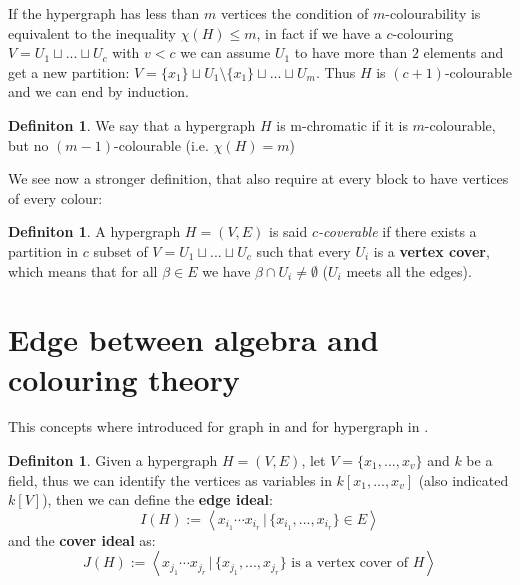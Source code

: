 \documentclass[notitlepage, a4]{book}
\theoremstyle{plain}
\theoremstyle{remark}
\theoremstyle{definition}
\newtheorem{deff}[teo]{Definiton}
\begin{document}
If the hypergraph has less than $ m $ vertices the condition of $ m $-colourability is equivalent to the inequality $ \chi(H) \leq m $, in fact if we have a $ c $-colouring $ V = U_1 \sqcup ... \sqcup U_c $ with $ v < c $ we can assume $ U_1 $ to have more than $ 2 $ elements and get a new partition: $ V = \{x_1\} \sqcup U_1 \setminus \{x_1\} \sqcup ... \sqcup U_m $. Thus $ H $ is $ (c+1) $-colourable and we can end by induction.

\begin{deff}
We say that a hypergraph $ H $ is m-chromatic if it is $ m $-colourable, but no $ (m-1) $-colourable (i.e. $\chi(H) = m  $)
\end{deff}

We see now a stronger definition, that also require at every block to have vertices of every colour:

\begin{deff} \label{def:cover}
A hypergraph $ H = (V,E) $ is said \textit{$ c $-coverable} if there exists a partition in $ c $ subset of $ V = U_1 \sqcup ... \sqcup U_c $ such that every $ U_i $ is a \textbf{vertex cover}, which means  that for all $ \beta \in E $ we have $ \beta \cap U_i \neq \emptyset $ ($ U_i $ meets all the edges). 
\end{deff}

\section{Edge between algebra and colouring theory}


This concepts where introduced for graph in \cite{Villa90} and for hypergraph in \cite{Ha08}.

\begin{deff}\label{def:edgecoverideal}
Given a hypergraph $ H = (V,E) $, let $ V = \{ x_1 , ... , x_v \} $ and $ k $ be a field, thus we can identify the vertices as variables in $ k[x_1 , ... , x_v] $ (also indicated $ k[V] $), then we can define the \textbf{edge ideal}:
\begin{equation}\label{eq:edgeideal}
I(H) := \left\langle x_{i_1} \cdots x_{i_r} \,|\, \{ x_{i_1} , ... , x_{i_r}\} \in E \right\rangle 
\end{equation}
and the \textbf{cover ideal} as:
\begin{equation}\label{eq:coverideal}
J(H) := \left\langle x_{j_1} \cdots x_{j_r} \,|\, \{ x_{j_1} , ... , x_{j_r}\} \text{ is a vertex cover of } H \right\rangle 
\end{equation}
\end{deff}
\end{document}
